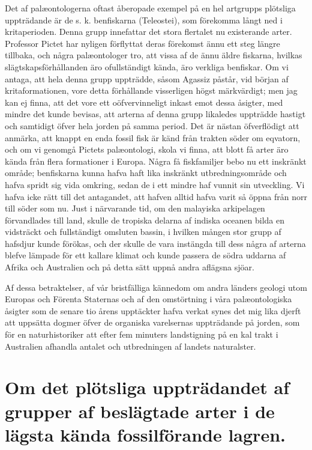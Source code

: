 Det af palæontologerna oftast åberopade exempel på en hel artgrupps plötsliga uppträdande är de s. k. benfiskarna (Teleostei), som förekomma långt ned i kritaperioden. Denna grupp innefattar det stora flertalet nu existerande arter. Professor Pictet har nyligen förflyttat deras förekomst ännu ett steg längre tillbaka, och några palæontologer tro, att vissa af de ännu äldre fiskarna, hvilkas slägtskapsförhållanden äro ofullständigt kända, äro verkliga benfiskar. Om vi antaga, att hela denna grupp uppträdde, såsom Agassiz påstår, vid början af kritaformationen, vore detta förhållande visserligen högst märkvärdigt; men jag kan ej finna, att det vore ett oöfvervinneligt inkast emot dessa åsigter, med mindre det kunde bevisas, att arterna af denna grupp likaledes uppträdde hastigt och samtidigt öfver hela jorden på samma period. Det är nästan öfverflödigt att anmärka, att knappt en enda fossil fisk är känd från trakten söder om eqvatorn, och om vi genomgå Pictets palæontologi, skola vi finna, att blott få arter äro kända från flera formationer i Europa. Några få fiskfamiljer bebo nu ett inskränkt område; benfiskarna kunna hafva haft lika inskränkt utbredningsområde och hafva spridt sig vida omkring, sedan de i ett mindre haf vunnit sin utveckling. Vi hafva icke rätt till det antagandet, att hafven alltid hafva varit så öppna från norr till söder som nu. Just i närvarande tid, om den malayiska arkipelagen förvandlades till land, skulle de tropiska delarna af indiska oceanen bilda en vidsträckt och fullständigt omsluten bassin, i hvilken mången stor grupp af hafsdjur kunde förökas, och der skulle de vara instängda till dess några af arterna blefve lämpade för ett kallare klimat och kunde passera de södra uddarna af Afrika och Australien och på detta sätt uppnå andra aflägsna sjöar.

Af dessa betraktelser, af vår bristfälliga kännedom om andra länders geologi utom Europas och Förenta Staternas och af den omstörtning i våra palæontologiska åsigter som de senare tio årens upptäckter hafva verkat synes det mig lika djerft att uppsätta dogmer öfver de organiska varelsernas uppträdande på jorden, som för en naturhistoriker att efter fem minuters landstigning på en kal trakt i Australien afhandla antalet och utbredningen af landets naturalster.



\section[Beslägtade arter i de lägsta lagren]{Om det plötsliga uppträdandet af grupper af beslägtade
arter i de lägsta kända fossilförande lagren.}

